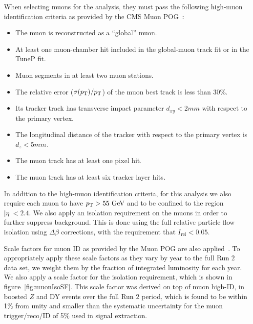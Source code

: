 When selecting muons for the analysis, they must pass the following high-\pt muon identification criteria as provided by the CMS Muon POG~\cite{MuonSelection}:
\begin{itemize}
  \item The muon is reconstructed as a ``global'' muon.
  \item At least one muon-chamber hit included in the global-muon track fit or in the TuneP fit.
  \item Muon segments in at least two muon stations.
  \item The \pt relative error ($\sigma(\pt)/\pt$) of the muon best track is less than 30\%.
  \item Its tracker track has transverse impact parameter $d_{xy}<2\unit{mm}$ with respect to the primary vertex.
  \item The longitudinal distance of the tracker with respect to the primary vertex is $d_z<5\unit{mm}$.
  \item The muon track has at least one pixel hit.
  \item The muon track has at least six tracker layer hits.
\end{itemize}

In addition to the high-\pt muon identification criteria, for this analysis we also require each muon to have $\pt>55\unit{GeV}$ and to be confined to the region $|\eta|<2.4$.
We also apply an isolation requirement on the muons in order to further suppress background.
This is done using the full relative particle flow isolation using $\Delta\beta$ corrections, with the requirement that $I_\mathrm{rel}<0.05$.

Scale factors for muon ID as provided by the Muon POG are also applied~\cite{MuonPAGs}.
To appropriately apply these scale factors as they vary by year to the full Run 2 data set, we weight them by the fraction of integrated luminosity for each year.
We also apply a scale factor for the isolation requirement, which is shown in figure~\ref{fig:muonIsoSF}.
This scale factor was derived on top of muon high-\pt ID, in boosted $Z$ and DY events over the full Run 2 period, which is found to be within 1\% from unity and smaller than the systematic uncertainty for the muon trigger/reco/ID of 5\% used in signal extraction.


